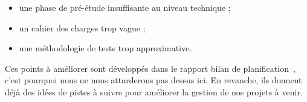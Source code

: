 \begin{itemize}
\item une phase de pré-étude insuffisante au niveau technique ;
\item un cahier des charges trop vague ;
\item une méthodologie de tests trop approximative.
\end{itemize}

Ces points à améliorer sont développés dans le rapport bilan de planification~\cite{bilanPlanif}, c'est pourquoi nous ne nous attarderons pas dessus ici. En revanche, ils donnent déjà des idées de pistes à suivre pour améliorer la gestion de nos projets à venir.